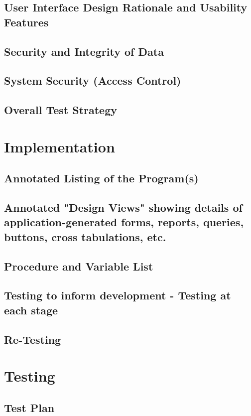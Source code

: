 \documentclass[11pt]{article}
\begin{document}
        \subsection{User Interface Design Rationale and Usability Features}
        \subsection{Security and Integrity of Data}
        \subsection{System Security (Access Control)}
        \subsection{Overall Test Strategy}

    \section{Implementation}
        \subsection{Annotated Listing of the Program(s)}
        \subsection{Annotated "Design Views" showing details of application-generated forms, reports, queries, buttons, cross tabulations, etc.}
        \subsection{Procedure and Variable List}
        \subsection{Testing to inform development - Testing at each stage}
        \subsection{Re-Testing}

    \section{Testing}
        \subsection{Test Plan}
\end{document}
